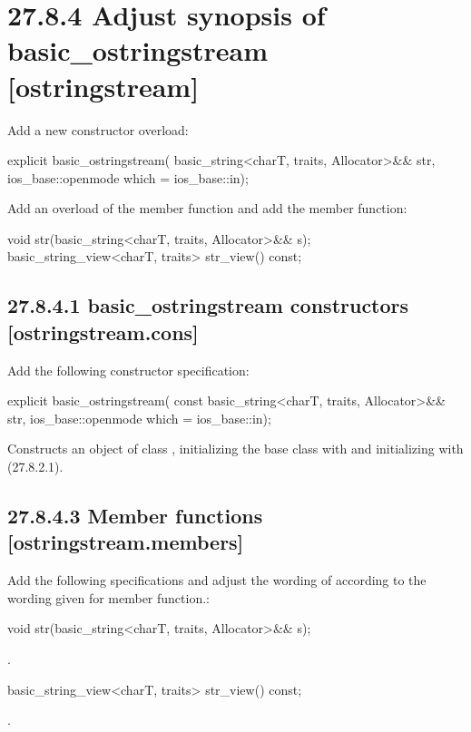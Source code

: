 \documentclass[ebook,11pt,article]{memoir}
\begin{document}

\section{27.8.4 Adjust synopsis of basic\_ostringstream [ostringstream]}
Add a new constructor overload:
\begin{codeblock}
           explicit basic_ostringstream(
             basic_string<charT, traits, Allocator>&& str,
             ios_base::openmode which = ios_base::in);
\end{codeblock}

Add an overload of the  member function and add the  member function:
\begin{codeblock}
void str(basic_string<charT, traits, Allocator>&& s);
basic_string_view<charT, traits> str_view() const;
\end{codeblock}

\subsection{27.8.4.1 basic\_ostringstream constructors [ostringstream.cons]}
Add the following constructor specification:
\begin{itemdecl}
explicit basic_ostringstream(
  const basic_string<charT, traits, Allocator>&& str,
  ios_base::openmode which = ios_base::in);
\end{itemdecl}
\begin{itemdescr}
\pnum
\effects Constructs an object of class , initializing the base class with  and initializing  with  (27.8.2.1).
\end{itemdescr}
\subsection{27.8.4.3 Member functions [ostringstream.members]}
Add the following specifications and adjust the wording of  according to the wording given for  member function.:
\begin{itemdecl}
void str(basic_string<charT, traits, Allocator>&& s);
\end{itemdecl}
\begin{itemdescr}
\pnum
\effects {}.
\end{itemdescr}
\begin{itemdecl}
basic_string_view<charT, traits> str_view() const;
\end{itemdecl}
\begin{itemdescr}
\pnum
\returns {}.
\end{itemdescr}
\end{document}
